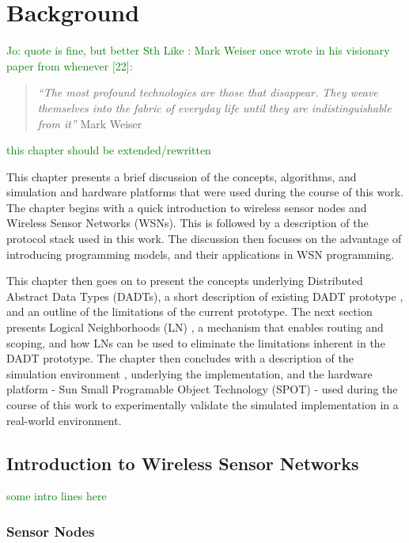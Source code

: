 \chapter{Background}

\textcolor{green}{Jo: quote is fine, but better Sth Like : Mark Weiser once
wrote in his visionary paper from whenever [22]:}

\begin{quote}
\emph{``The most profound technologies are those that disappear. They weave
themselves into the fabric of everyday life until they are indistinguishable
from it''} 
Mark Weiser \cite{Weiser_ComputerIn21stCentury}
\end{quote}

\textcolor{green}{this chapter should be extended/rewritten}

This chapter presents a brief discussion of the concepts, algorithms, and 
simulation and hardware platforms that were used
during the course of this work. The chapter begins with a quick introduction to 
wireless sensor nodes and Wireless Sensor Networks (WSNs). This is followed by a
description of the protocol stack used in this work. The discussion
then focuses on the advantage of introducing programming models, and their
applications in WSN programming.

This chapter then goes on to present the concepts underlying
Distributed Abstract Data Types (DADTs), a short 
description of existing DADT prototype \cite{migliavacca_DADT:2006}, and  an
outline
of the limitations of the current prototype. The next section presents 
Logical Neighborhoods (LN) \cite{mottola_LNScoping:2006}, a mechanism that
enables routing and scoping, and how LNs can be used to eliminate the
limitations inherent in the DADT prototype. The chapter then concludes 
with a description of the simulation environment \cite{barr_JIST:2005}, \cite{barr_SWANS} underlying the 
implementation, and the hardware platform - Sun Small Programable Object
Technology (SPOT) \cite{simon_squawk:2006} - used during the course of this work
to experimentally validate the simulated implementation in a
real-world environment. 

\section{Introduction to Wireless Sensor Networks}

\textcolor{green}{some intro lines here}

\subsection{Sensor Nodes} \label{subsec:sensornodes}

